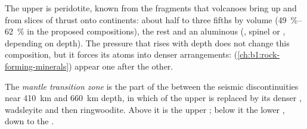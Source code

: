 The upper  is peridotite, known from the fragments that volcanoes bring
up and from slices of  thrust onto continents: about half to
three fifths  by volume (\qtyrange{49}{62}{\percent} in the proposed
compositions), the rest  and an aluminous  (,
spinel or , depending on depth). The pressure that rises with depth
does not change this composition, but it forces its atoms into denser
arrangements:  (\cref{ch:b1:rock-forming-minerals}) appear one after
the other.

\begin{definition}\label{def:b1:layered-earth:transition-zone}
The \emph{mantle transition zone} is the part
of the  between the seismic discontinuities near \qty{410}{km} and
\qty{660}{km} depth, in which  of the upper  is replaced by its
denser , wadsleyite and then ringwoodite. Above it is the upper
; below it the lower , down to the .
\end{definition}

